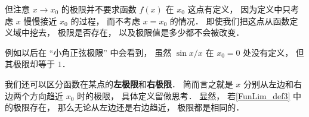 但注意 $x\to x_0$ 的极限并不要求函数 $f(x)$ 在 $x_0$ 这点有定义， 因为定义中只考虑 $x$ 慢慢接近 $x_0$ 的过程， 而不考虑 $x = x_0$ 的情况． 即使我们把这点从函数定义域中挖去， 极限是否存在， 以及极限值是多少都不会被改变．

例如以后在 “小角正弦极限” 中会看到， 虽然 $\sin x/ x$ 在 $x_0 = 0$ 处没有定义， 但其极限却等于 $1$．


我们还可以区分函数在某点的\textbf{左极限}和\textbf{右极限}． 简而言之就是 $x$ 分别从左边和右边两个方向趋近 $x_0$ 时的极限， 具体定义留做思考． 显然， 若\autoref{FunLim_def3} 中的极限存在， 那么无论从左边还是右边趋近， 极限都是相同的．